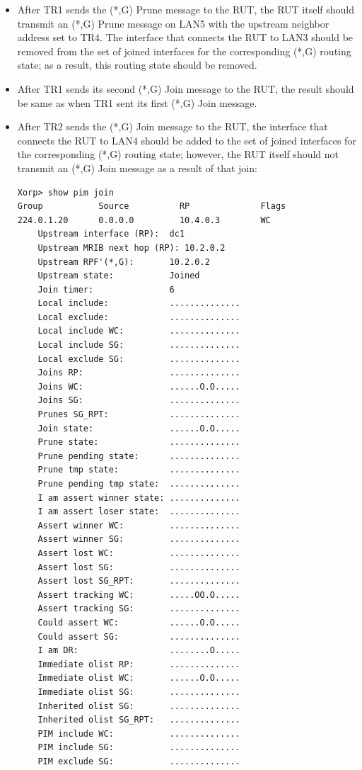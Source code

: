 \documentclass[11pt]{report}
\begin{document}
\begin{itemize}
  \item After TR1 sends the (*,G) Prune message to the RUT, the RUT itself
  should transmit an (*,G) Prune message on LAN5 with the upstream neighbor
  address set to TR4. The interface that connects the RUT to LAN3 should be
  removed from the set of joined interfaces for the corresponding (*,G)
  routing state; as a result, this routing state should be removed.

  \item After TR1 sends its second (*,G) Join message to the RUT, the
  result should be same as when TR1 sent its first (*,G) Join message.

  \item After TR2 sends the (*,G) Join message to the RUT, the interface
  that connects the RUT to LAN4 should be added to the set of joined
  interfaces for the corresponding (*,G) routing state; however, the RUT
  itself should not transmit an (*,G) Join message as a result of that
  join:

\begin{verbatim}
Xorp> show pim join
Group           Source          RP              Flags
224.0.1.20      0.0.0.0         10.4.0.3        WC   
    Upstream interface (RP):  dc1
    Upstream MRIB next hop (RP): 10.2.0.2
    Upstream RPF'(*,G):       10.2.0.2
    Upstream state:           Joined 
    Join timer:               6
    Local include:            ..............
    Local exclude:            ..............
    Local include WC:         ..............
    Local include SG:         ..............
    Local exclude SG:         ..............
    Joins RP:                 ..............
    Joins WC:                 ......O.O.....
    Joins SG:                 ..............
    Prunes SG_RPT:            ..............
    Join state:               ......O.O.....
    Prune state:              ..............
    Prune pending state:      ..............
    Prune tmp state:          ..............
    Prune pending tmp state:  ..............
    I am assert winner state: ..............
    I am assert loser state:  ..............
    Assert winner WC:         ..............
    Assert winner SG:         ..............
    Assert lost WC:           ..............
    Assert lost SG:           ..............
    Assert lost SG_RPT:       ..............
    Assert tracking WC:       .....OO.O.....
    Assert tracking SG:       ..............
    Could assert WC:          ......O.O.....
    Could assert SG:          ..............
    I am DR:                  ........O.....
    Immediate olist RP:       ..............
    Immediate olist WC:       ......O.O.....
    Immediate olist SG:       ..............
    Inherited olist SG:       ..............
    Inherited olist SG_RPT:   ..............
    PIM include WC:           ..............
    PIM include SG:           ..............
    PIM exclude SG:           ..............
\end{verbatim}


\end{itemize}
\end{document}
